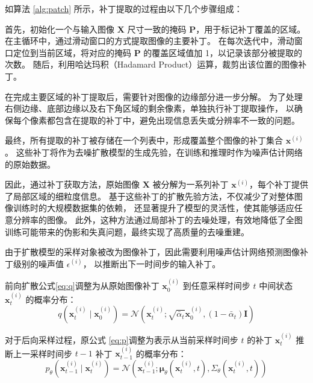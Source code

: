 如算法 \ref{alg:patch} 所示，补丁提取的过程由以下几个步骤组成：

首先，初始化一个与输入图像 $\bm{X}$ 尺寸一致的掩码 $\bm{P}$，用于标记补丁覆盖的区域。
在主循环中，通过滑动窗口的方式提取图像的主要补丁。
在每次迭代中，滑动窗口定位到当前区域，将对应的掩码 $\bm{P}$ 的覆盖区域值加 1，以记录该部分被提取的次数。
随后，利用哈达玛积（Hadamard Product）运算，裁剪出该位置的图像补丁。

在完成主要区域的补丁提取后，需要针对图像的边缘部分进一步分解。
为了处理右侧边缘、底部边缘以及右下角区域的剩余像素，单独执行补丁提取操作，
以确保每个像素都包含在提取的补丁中，避免出现信息丢失或分辨率不一致的问题。

最终，所有提取的补丁被存储在一个列表中，形成覆盖整个图像的补丁集合 ${\mathbf{x}^{(i)}}$。
这些补丁将作为去噪扩散模型的生成先验，在训练和推理时作为噪声估计网络的原始数据。


因此，通过补丁获取方法，原始图像 $\bm{X}$ 被分解为一系列补丁 ${\mathbf{x}^{(i)}}$，每个补丁提供了局部区域的细粒度信息。
基于这些补丁的扩散先验方法，不仅减少了对整体图像训练时的大规模数据集的依赖，
还显著提升了模型的灵活性，使其能够适应任意分辨率的图像。
此外，这种方法通过局部补丁的去噪处理，有效地降低了全图训练可能带来的伪影和失真问题，最终实现了高质量的去噪重建。

由于扩散模型的采样对象被改为图像补丁，因此需要利用噪声估计网络预测图像补丁级别的噪声值 $\epsilon^{(i)}$，
以推断出下一时间步的输入补丁。

前向扩散公式\ref{eq:q}调整为从原始图像补丁 $\mathbf{x}^{(i)}_0$ 到任意采样时间步 $t$ 中间状态 $\mathbf{x}^{(i)}_t$ 的概率分布：
\begin{equation}
    \label{eq:q-patch}
        q\left(\mathbf{x}^{(i)}_t \mid \mathbf{x}^{(i)}_0\right)=\mathcal{N}\left(\mathbf{x}^{(i)}_t ; \sqrt{\bar{\alpha}_t} \mathbf{x}^{(i)}_0,\left(1-\bar{\alpha}_t\right) \mathbf{I}\right)
\end{equation}

对于后向采样过程，原公式 \ref{eq:p}调整为表示从当前采样时间步 $t$ 的补丁 $\mathbf{x}^{(i)}_t$ 推断上一采样时间步 $t-1$ 补丁 $\mathbf{x}^{(i)}_{t-1}$ 的概率分布：
\begin{equation}
    \label{eq:p-patch}
    p_\theta\left(\mathbf{x}^{(i)}_{t-1} \mid \mathbf{x}^{(i)}_t\right) =\mathcal{N}\left(\mathbf{x}^{(i)}_{t-1} ; \boldsymbol{\mu}_\theta\left(\mathbf{x}^{(i)}_t, t\right), \Sigma_\theta\left(\mathbf{x}^{(i)}_t, t\right)\right)
\end{equation}

